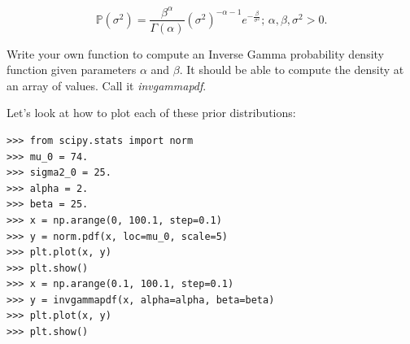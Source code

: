 $$\mathbb{P}(\sigma^{2}) = \frac{\beta^{\alpha}}{\Gamma(\alpha)}(\sigma^{2})^{-\alpha - 1}e^{-\frac{\beta}{\sigma^{2}}}\text{; } \alpha,\beta,\sigma^2 >0.$$

\begin{problem}
Write your own function to compute an Inverse Gamma probability density function given parameters $\alpha$ and $\beta$. It should be able to compute the density at an array of values. Call it \emph{invgammapdf}.
\end{problem}

Let's look at how to plot each of these prior distributions:

\begin{lstlisting}
>>> from scipy.stats import norm
>>> mu_0 = 74.
>>> sigma2_0 = 25.
>>> alpha = 2.
>>> beta = 25.
>>> x = np.arange(0, 100.1, step=0.1)
>>> y = norm.pdf(x, loc=mu_0, scale=5)
>>> plt.plot(x, y)
>>> plt.show()
>>> x = np.arange(0.1, 100.1, step=0.1)
>>> y = invgammapdf(x, alpha=alpha, beta=beta)
>>> plt.plot(x, y)
>>> plt.show()
\end{lstlisting}

